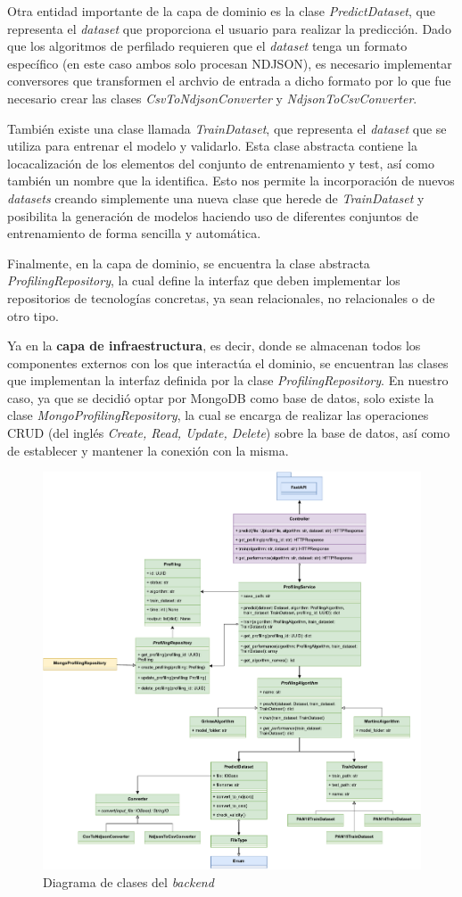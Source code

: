 \bigskip
Otra entidad importante de la capa de dominio es la clase \textit{PredictDataset}, que representa el \textit{dataset} que proporciona el usuario
para realizar la predicción. Dado que los algoritmos de perfilado requieren que el \textit{dataset} tenga un formato específico (en este caso
ambos solo procesan NDJSON), es necesario implementar conversores que transformen el archvio de entrada a dicho formato por lo que
fue necesario crear las clases \textit{CsvToNdjsonConverter} y \textit{NdjsonToCsvConverter}.

\bigskip
También existe una clase llamada \textit{TrainDataset}, que representa
el \textit{dataset} que se utiliza para entrenar el modelo y validarlo. Esta clase abstracta contiene la locacalización de los elementos
del conjunto de entrenamiento y test, así como también un nombre que la identifica. Esto nos permite la incorporación de nuevos \textit{datasets} creando simplemente
una nueva clase que herede de \textit{TrainDataset} y posibilita la generación de modelos haciendo uso de diferentes conjuntos de entrenamiento de forma sencilla y automática. 

\bigskip
Finalmente, en la capa de dominio, se encuentra la clase abstracta \textit{ProfilingRepository}, la cual define la interfaz que deben implementar
los repositorios de tecnologías concretas, ya sean relacionales, no relacionales o de otro tipo.

\bigskip
Ya en la \textbf{capa de infraestructura}, es decir, donde se almacenan todos los componentes externos con los que interactúa el dominio, se encuentran las clases que implementan
la interfaz definida por la clase \textit{ProfilingRepository}. En nuestro caso, ya que se decidió optar por MongoDB como base de datos, solo existe
la clase \textit{MongoProfilingRepository}, la cual se encarga de realizar las operaciones CRUD (del inglés \textit{Create, Read, Update, Delete}) sobre la base de datos, así
como de establecer y mantener la conexión con la misma.

\bigskip
\begin{figure}[H]
	\centering
	\includegraphics[width=\textwidth]{diagramas/clases.pdf}
	\caption{Diagrama de clases del \textit{backend}}
	\label{fig:implementacion_clases}
\end{figure}
